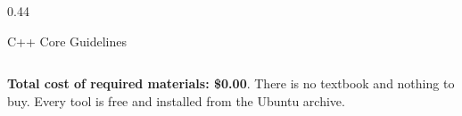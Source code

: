 \documentclass[
    10pt,
    dvipsnames,
    svgnames,
    x11names,
    aspectratio=1610,
    english,
    codeminted]{beamer}
\begin{document}
\begin{frame}{\secname}
\begin{columns}[T,onlytextwidth]
\begin{column}{0.44\textwidth}
\medskip
{}
\begin{compactitem}
\footnotesize
    \item {}
    \item C++ Core Guidelines
    \item {}
\end{compactitem}
\end{column}
\end{columns}
\begin{MyBox}
\textbf{Total cost of required materials: \$0.00}. There is no textbook and nothing to buy. Every tool is free and installed from the Ubuntu archive.
\end{MyBox}
\end{frame}
\endgroup

\end{document}
